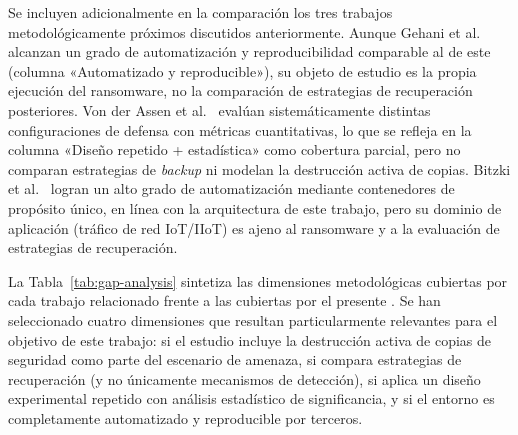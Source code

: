 \documentclass[../main.tex]{subfiles}
\begin{document}
Se incluyen adicionalmente en la comparación los tres trabajos metodológicamente
próximos discutidos anteriormente. Aunque Gehani et al.~\cite{gehani2023}
alcanzan un grado de automatización y reproducibilidad comparable al de este
\pfg (columna «Automatizado y reproducible»), su objeto de estudio es la propia
ejecución del ransomware, no la comparación de estrategias de recuperación
posteriores. Von der Assen et al.~\cite{vonderassen2024} evalúan
sistemáticamente distintas configuraciones de defensa con métricas cuantitativas,
lo que se refleja en la columna «Diseño repetido + estadística» como cobertura
parcial, pero no comparan estrategias de \emph{backup} ni modelan la destrucción
activa de copias. Bitzki et al.~\cite{netsecbed2026} logran un alto grado de
automatización mediante contenedores de propósito único, en línea con la
arquitectura de este trabajo, pero su dominio de aplicación (tráfico de red
IoT/IIoT) es ajeno al ransomware y a la evaluación de estrategias de recuperación.

La Tabla~\ref{tab:gap-analysis} sintetiza las dimensiones metodológicas
cubiertas por cada trabajo relacionado frente a las cubiertas por el
presente \pfg. Se han seleccionado cuatro dimensiones que resultan
particularmente relevantes para el objetivo de este trabajo: si el estudio
incluye la destrucción activa de copias de seguridad como parte del
escenario de amenaza, si compara estrategias de recuperación (y no
únicamente mecanismos de detección), si aplica un diseño experimental
repetido con análisis estadístico de significancia, y si el entorno es
completamente automatizado y reproducible por terceros.
\end{document}
